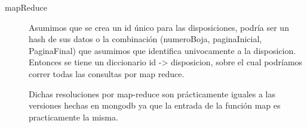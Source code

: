 \begin{description}
\item[mapReduce]
    Asumimos que se crea un id único para las disposiciones, podría ser un hash de sus datos o
        la combinación (numeroBoja, paginaInicial, PaginaFinal) que asumimos que identifica
        univocamente a la disposicion. Entonces se tiene un diccionario id -> disposicion,
        sobre el cual podríamos correr todas las consultas por map reduce.

    Dichas resoluciones por map-reduce son prácticamente iguales a las versiones hechas en mongodb
        ya que la entrada de la función map es practicamente la misma.

\end{description}



